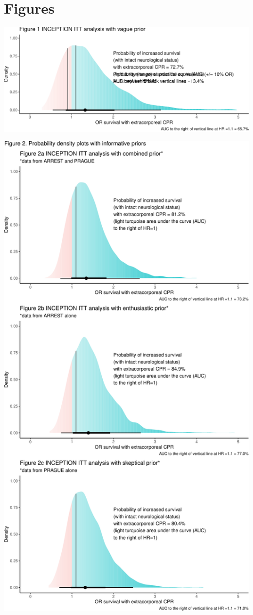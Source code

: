\documentclass[
  super,
  preprint,
  3p]{elsarticle}
\begin{document}
\newpage

\hypertarget{figures}{%
\section{Figures}\label{figures}}

\includegraphics{manuscript_files/figure-pdf/fig1-1.pdf}

\newpage

\includegraphics{manuscript_files/figure-pdf/fig2-1.pdf}

\newpage


\renewcommand\refname{References}
  
\end{document}

